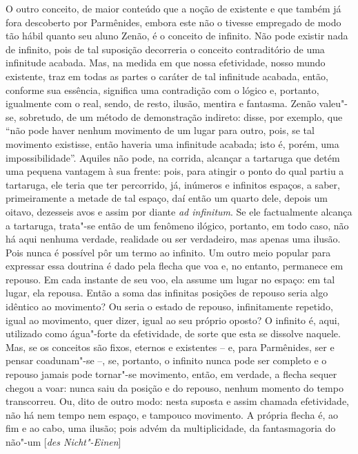 O outro conceito, de maior conteúdo que a noção de existente e que
também já fora descoberto por Parmênides, embora este não o tivesse
empregado de modo tão hábil quanto seu aluno Zenão, é o conceito de
infinito. Não pode existir nada de infinito, pois de tal suposição
decorreria o conceito contraditório de uma infinitude acabada. Mas, na
medida em que nossa efetividade, nosso mundo existente, traz em todas
as partes o caráter de tal infinitude acabada, então, conforme sua
essência, significa uma contradição com o lógico e, portanto,
igualmente com o real, sendo, de resto, ilusão, mentira e fantasma.
Zenão valeu"-se, sobretudo, de um método de demonstração indireto: \label{zenaovaleuse}
disse, por exemplo, que ``não pode haver nenhum movimento de um lugar
para outro, pois, se tal movimento existisse, então haveria uma
infinitude acabada; isto é, porém, uma impossibilidade''. Aquiles não
pode, na corrida, alcançar a tartaruga que detém uma pequena vantagem à
sua frente: pois, para atingir o ponto do qual partiu a tartaruga, ele
teria que ter percorrido, já, inúmeros e infinitos espaços, a saber,
primeiramente a metade de tal espaço, daí então um quarto dele, depois
um oitavo, dezesseis avos e assim por diante \textit{ad infinitum}. Se
ele factualmente alcança a tartaruga, trata"-se então de um fenômeno
ilógico, portanto, em todo caso, não há aqui nenhuma verdade, realidade
ou ser verdadeiro, mas apenas uma ilusão. Pois nunca é possível pôr um
termo ao infinito. Um outro meio popular para expressar essa doutrina é
dado pela flecha que voa e, no entanto, permanece em repouso. Em cada
instante de seu voo, ela assume um lugar no espaço: em tal lugar, ela
repousa. Então a soma das infinitas posições de repouso seria algo
idêntico ao movimento? Ou seria o estado de repouso, infinitamente
repetido, igual ao movimento, quer dizer, igual ao seu próprio oposto?
O infinito é, aqui, utilizado como água"-forte da efetividade, de sorte
que esta se dissolve naquele. Mas, se os conceitos são fixos, eternos e
existentes -- e, para Parmênides, ser e pensar coadunam"-se --, se,
portanto, o infinito nunca pode ser completo e o repouso jamais pode
tornar"-se movimento, então, em verdade, a flecha sequer chegou a voar:
nunca saiu da posição e do repouso, nenhum momento do tempo
transcorreu. Ou, dito de outro modo: nesta suposta e assim chamada
efetividade, não há nem tempo nem espaço, e tampouco movimento. A
própria flecha é, ao fim e ao cabo, uma ilusão; pois advém da
multiplicidade, da fantasmagoria do não"-um [\textit{des Nicht"-Einen}]
